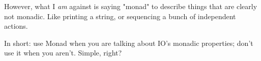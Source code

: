 \documentclass[]{article}
\begin{document}
\begin{itemize}
  However, what I \emph{am} against is saying "monad" to describe things that
  are clearly not monadic. Like printing a string, or sequencing a bunch of
  independent actions.

  In short: use Monad when you are talking about IO's monadic properties; don't
  use it when you aren't. Simple, right?
\end{itemize}
\end{document}
